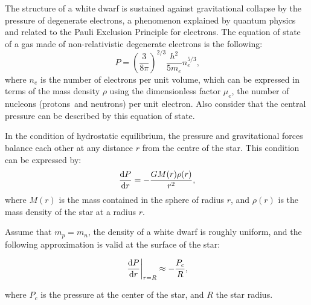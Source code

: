 The structure of a white dwarf is sustained against gravitational collapse by the pressure of degenerate electrons, a phenomenon explained by quantum physics and related to the Pauli Exclusion Principle for electrons. The equation of state of a gas made of non-relativistic degenerate electrons is the following:
\[P = \left(\dfrac{3}{8\pi}\right)^{2/3}\dfrac{h^{2}}{5m_{e}}n_{e}^{5/3}\text{,}\]
where $n_e$ is the number of electrons per unit volume, which can be expressed in terms of the mass density $\rho$ using the dimensionless factor $\mu_e$, the number of nucleons (protons and neutrons) per unit electron. Also consider that the central pressure can be described by this equation of state.

In the condition of hydrostatic equilibrium, the pressure and gravitational forces balance each other at any distance $r$ from the centre of the star. This condition can be expressed by:
\[\dfrac{{\rm d} P}{{\rm d} r} = -\dfrac{GM(r)\rho(r)}{r^{2}}\text{,}\]
where $M(r)$ is the mass contained in the sphere of radius $r$, and $\rho(r)$ is the mass density of the star at a radius $r$.

Assume that $m_p = m_n$, the density of a white dwarf is roughly uniform, and the following approximation is valid at the surface of the star:

\[\left.\dfrac{{\rm d} P}{{\rm d} r} \right |_{r = R} \approx -\dfrac{P_{c}}{R}\text{,}\]

where $P_{c}$ is the pressure at the center of the star, and $R$ the star radius.

